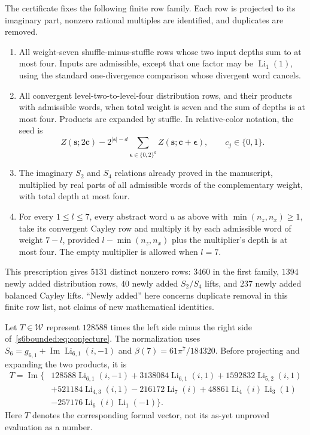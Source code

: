 The certificate fixes the following finite row family. Each row is
projected to its imaginary part, nonzero rational multiples are
identified, and duplicates are removed.
\begin{enumerate}
\item All weight-seven shuffle-minus-stuffle rows whose two input
      depths sum to at most four. Inputs are admissible, except that
      one factor may be $\operatorname{Li}_1(1)$, using the standard
      one-divergence comparison whose divergent word cancels.
\item All convergent level-two-to-level-four distribution rows,
      and their products with admissible words, when total weight is
      seven and the sum of depths is at most four. Products are
      expanded by stuffle. In relative-color notation, the seed is
      \[
      Z(\boldsymbol s;2\boldsymbol c)
      -2^{|\boldsymbol s|-d}
        \sum_{\boldsymbol\epsilon\in\{0,2\}^d}
        Z(\boldsymbol s;\boldsymbol c+\boldsymbol\epsilon),
      \qquad c_j\in\{0,1\}.
      \]
\item The imaginary $S_2$ and $S_4$ relations already proved in the
      manuscript, multiplied by real parts of all admissible words
      of the complementary weight, with total depth at most four.
\item For every $1\le l\le7$, every abstract word $u$ as above with
      $\min(n_z,n_x)\ge1$, take its convergent Cayley row and multiply
      it by each admissible word of weight $7-l$, provided
      $l-\min(n_z,n_x)$ plus the multiplier's depth is at most four.
      The empty multiplier is allowed when $l=7$.
\end{enumerate}
This prescription gives $5131$ distinct nonzero rows: $3460$ in the
first family, $1394$ newly added distribution rows, $40$ newly added
$S_2/S_4$ lifts, and $237$ newly added balanced Cayley lifts.
``Newly added'' here concerns duplicate removal in this finite row list,
not claims of new mathematical identities.

Let $T\in\mathcal W$ represent $128588$ times the left side minus the
right side of~\eqref{s6bounded:eq:conjecture}. The normalization uses
$S_6=g_{6,1}+\operatorname{Im}\operatorname{Li}_{6,1}(i,-1)$ and
$\beta(7)=61\pi^7/184320$. Before projecting and expanding the two
products, it is
\begin{align*}
 T=\operatorname{Im}\{&128588\operatorname{Li}_{6,1}(i,-1)
 +3138084\operatorname{Li}_{6,1}(i,1)
 +1592832\operatorname{Li}_{5,2}(i,1)\\
 &+521184\operatorname{Li}_{4,3}(i,1)
 -216172\operatorname{Li}_7(i)
 +48861\operatorname{Li}_4(i)\operatorname{Li}_3(1)\\
 &-257176\operatorname{Li}_6(i)\operatorname{Li}_1(-1)\}.
\end{align*}
Here $T$ denotes the corresponding formal vector, not its as-yet
unproved evaluation as a number.

